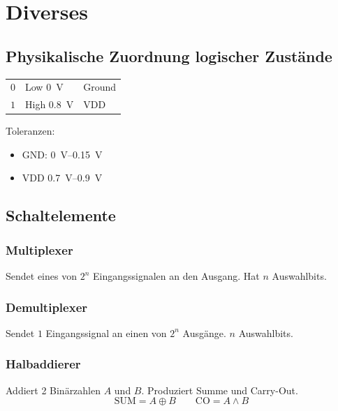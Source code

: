 \section{Diverses}
\subsection{Physikalische Zuordnung logischer Zustände}
\begin{flushleft}
    \begin{tabular}{c l l}
        $0$ & Low \SI{0}{\volt} & Ground\\
        $1$ & High \SI{0.8}{\volt} & VDD
    \end{tabular}
\end{flushleft}
Toleranzen:
\begin{itemize}
    \item GND: \SIrange{0}{0.15}{\volt}
    \item VDD \SIrange{0.7}{0.9}{\volt}
\end{itemize}
\subsection{Schaltelemente}
\begin{center}
    \begin{minipage}[t]{0.45\linewidth}
        \subsubsection{Multiplexer}
        Sendet eines von $2^n$ Eingangssignalen an den Ausgang. Hat $n$ Auswahlbits.
    \end{minipage}
    \hfill
    \begin{minipage}[t]{0.45\linewidth}
        \subsubsection{Demultiplexer}
        Sendet $1$ Eingangssignal an einen von $2^n$ Ausgänge. $n$ Auswahlbits.
    \end{minipage}
\end{center}
\subsubsection{Halbaddierer}
Addiert 2 Binärzahlen $A$ und $B$. Produziert Summe und Carry-Out.
\begin{equation*}
    \text{SUM} = A \oplus B \qquad \text{CO} = A \land B
\end{equation*}

